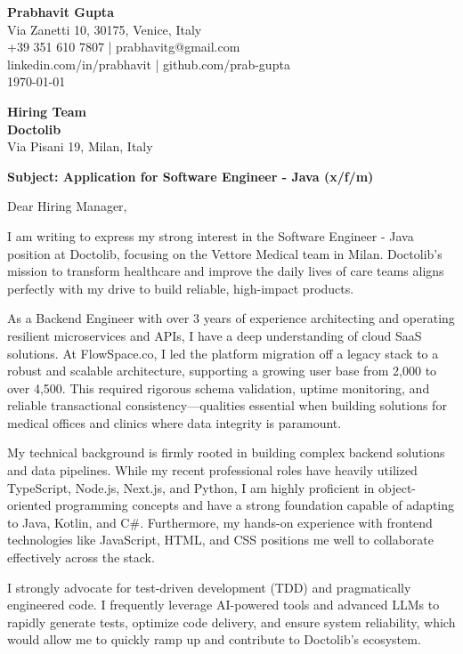 \documentclass[11pt,a4paper]{article}
\begin{document}
\thispagestyle{empty}

\textbf{Prabhavit Gupta}\\
Via Zanetti 10, 30175, Venice, Italy\\
+39 351 610 7807 | prabhavitg@gmail.com\\
linkedin.com/in/prabhavit | github.com/prab-gupta\\

\vspace{1em}
\today

\vspace{1em}
\textbf{Hiring Team}\\
\textbf{Doctolib}\\
Via Pisani 19, Milan, Italy

\vspace{1em}
\textbf{Subject: Application for Software Engineer - Java (x/f/m)}

\vspace{1em}
Dear Hiring Manager,

I am writing to express my strong interest in the Software Engineer - Java position at Doctolib, focusing on the Vettore Medical team in Milan. Doctolib's mission to transform healthcare and improve the daily lives of care teams aligns perfectly with my drive to build reliable, high-impact products. 

As a Backend Engineer with over 3 years of experience architecting and operating resilient microservices and APIs, I have a deep understanding of cloud SaaS solutions. At FlowSpace.co, I led the platform migration off a legacy stack to a robust and scalable architecture, supporting a growing user base from 2,000 to over 4,500. This required rigorous schema validation, uptime monitoring, and reliable transactional consistency—qualities essential when building solutions for medical offices and clinics where data integrity is paramount.

My technical background is firmly rooted in building complex backend solutions and data pipelines. While my recent professional roles have heavily utilized TypeScript, Node.js, Next.js, and Python, I am highly proficient in object-oriented programming concepts and have a strong foundation capable of adapting to Java, Kotlin, and C\#. Furthermore, my hands-on experience with frontend technologies like JavaScript, HTML, and CSS positions me well to collaborate effectively across the stack.

I strongly advocate for test-driven development (TDD) and pragmatically engineered code. I frequently leverage AI-powered tools and advanced LLMs to rapidly generate tests, optimize code delivery, and ensure system reliability, which would allow me to quickly ramp up and contribute to Doctolib's ecosystem.
\end{document}
